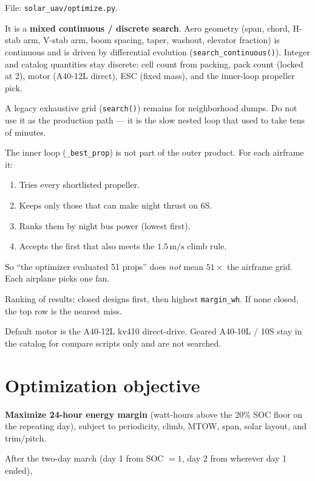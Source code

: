\documentclass[11pt,letterpaper]{article}
\newcommand{\code}[1]{\texttt{#1}}
\begin{document}
File: \code{solar\_uav/optimize.py}.

It is a \textbf{mixed continuous / discrete search}. Aero geometry (span, chord, H-stab arm, V-stab arm, boom spacing, taper, washout, elevator fraction) is continuous and is driven by differential evolution (\code{search\_continuous()}). Integer and catalog quantities stay discrete: cell count from packing, pack count (locked at 2), motor (A40-12L direct), ESC (fixed mass), and the inner-loop propeller pick.

A legacy exhaustive grid (\code{search()}) remains for neighborhood dumps. Do not use it as the production path --- it is the slow nested loop that used to take tens of minutes.

The inner loop (\code{\_best\_prop}) is not part of the outer product. For each airframe it:

\begin{enumerate}
  \item Tries every shortlisted propeller.
  \item Keeps only those that can make night thrust on 6S.
  \item Ranks them by night bus power (lowest first).
  \item Accepts the first that also meets the $1.5\,\mathrm{m/s}$ climb rule.
\end{enumerate}

So ``the optimizer evaluated 51 props'' does \emph{not} mean $51\times$ the airframe grid. Each airplane picks one fan.

Ranking of results: closed designs first, then highest \code{margin\_wh}. If none closed, the top row is the nearest miss.

Default motor is the A40-12L kv410 direct-drive. Geared A40-10L / 10S stay in the catalog for compare scripts only and are not searched.

\section{Optimization objective}

\textbf{Maximize 24-hour energy margin} (watt-hours above the 20\% SOC floor on the repeating day), subject to periodicity, climb, MTOW, span, solar layout, and trim/pitch.

After the two-day march (day 1 from SOC $=1$, day 2 from wherever day 1 ended),
\end{document}
